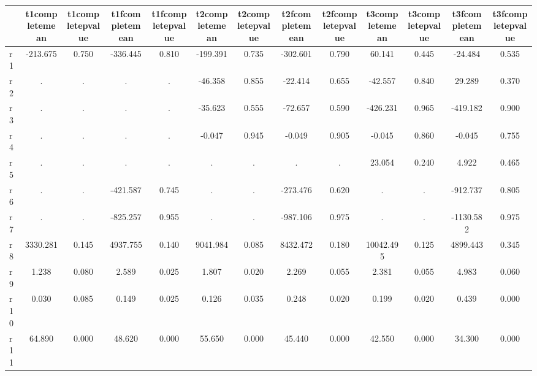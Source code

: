 \begin{table}[htbp]
\begin{tabular}{lcccccccccccc} \hline \hline
 & t1completemean  & t1completepvalue  & t1fcompletemean  & t1fcompletepvalue  & t2completemean  & t2completepvalue  & t2fcompletemean  & t2fcompletepvalue  & t3completemean  & t3completepvalue  & t3fcompletemean  & t3fcompletepvalue  \\  \hline 
r1 &  -213.675 &     0.750 &  -336.445 &     0.810 &  -199.391 &     0.735 &  -302.601 &     0.790 &    60.141 &     0.445 &   -24.484 &     0.535 \\  
r2 &         . &         . &         . &         . &   -46.358 &     0.855 &   -22.414 &     0.655 &   -42.557 &     0.840 &    29.289 &     0.370 \\  
r3 &         . &         . &         . &         . &   -35.623 &     0.555 &   -72.657 &     0.590 &  -426.231 &     0.965 &  -419.182 &     0.900 \\  
r4 &         . &         . &         . &         . &    -0.047 &     0.945 &    -0.049 &     0.905 &    -0.045 &     0.860 &    -0.045 &     0.755 \\  
r5 &         . &         . &         . &         . &         . &         . &         . &         . &    23.054 &     0.240 &     4.922 &     0.465 \\  
r6 &         . &         . &  -421.587 &     0.745 &         . &         . &  -273.476 &     0.620 &         . &         . &  -912.737 &     0.805 \\  
r7 &         . &         . &  -825.257 &     0.955 &         . &         . &  -987.106 &     0.975 &         . &         . & -1130.582 &     0.975 \\  
r8 &  3330.281 &     0.145 &  4937.755 &     0.140 &  9041.984 &     0.085 &  8432.472 &     0.180 & 10042.495 &     0.125 &  4899.443 &     0.345 \\  
r9 &     1.238 &     0.080 &     2.589 &     0.025 &     1.807 &     0.020 &     2.269 &     0.055 &     2.381 &     0.055 &     4.983 &     0.060 \\  
r10 &     0.030 &     0.085 &     0.149 &     0.025 &     0.126 &     0.035 &     0.248 &     0.020 &     0.199 &     0.020 &     0.439 &     0.000 \\  
r11 &    64.890 &     0.000 &    48.620 &     0.000 &    55.650 &     0.000 &    45.440 &     0.000 &    42.550 &     0.000 &    34.300 &     0.000 \\  
\hline \hline \end{tabular}
\end{table}
